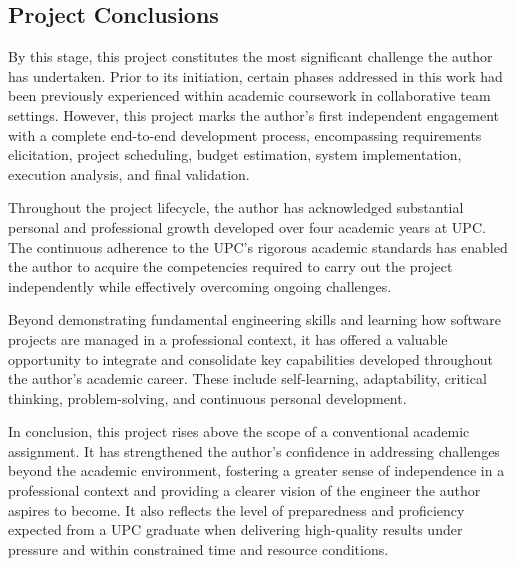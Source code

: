\newpage

\subsection{Project Conclusions}

By this stage, this project constitutes the most significant challenge the author has undertaken. Prior to its initiation, certain phases addressed in this work had been previously experienced within academic coursework in collaborative team settings. However, this project marks the author's first independent engagement with a complete end-to-end development process, encompassing requirements elicitation, project scheduling, budget estimation, system implementation, execution analysis, and final validation.

Throughout the project lifecycle, the author has acknowledged substantial personal and professional growth developed over four academic years at UPC. The continuous adherence to the UPC's rigorous academic standards has enabled the author to acquire the competencies required to carry out the project independently while effectively overcoming ongoing challenges.

Beyond demonstrating fundamental engineering skills and learning how software projects are managed in a professional context, it has offered a valuable opportunity to integrate and consolidate key capabilities developed throughout the author's academic career. These include self-learning, adaptability, critical thinking, problem-solving, and continuous personal development.

In conclusion, this project rises above the scope of a conventional academic assignment. It has strengthened the author's confidence in addressing challenges beyond the academic environment, fostering a greater sense of independence in a professional context and providing a clearer vision of the engineer the author aspires to become. It also reflects the level of preparedness and proficiency expected from a UPC graduate when delivering high-quality results under pressure and within constrained time and resource conditions. 
